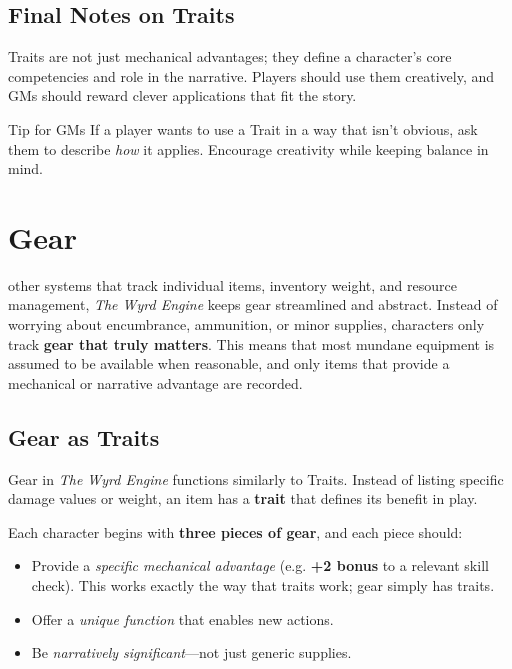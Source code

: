 \subsection{Final Notes on Traits}

Traits are not just mechanical advantages; they define a character’s core competencies and role in the narrative. Players should use them creatively, and GMs should reward clever applications that fit the story.

\begin{DndComment}{Tip for GMs}
 If a player wants to use a Trait in a way that isn’t obvious, ask them to describe \emph{how} it applies. Encourage creativity while keeping balance in mind.
\end{DndComment}

\section{Gear}

 other systems that track individual items, inventory weight, and resource management, \emph{The Wyrd Engine} keeps gear streamlined and abstract. Instead of worrying about encumbrance, ammunition, or minor supplies, characters only track \textbf{gear that truly matters}. This means that most mundane equipment is assumed to be available when reasonable, and only items that provide a mechanical or narrative advantage are recorded.

\subsection{Gear as Traits}
Gear in \emph{The Wyrd Engine} functions similarly to Traits. Instead of listing specific damage values or weight, an item has a \textbf{trait} that defines its benefit in play. 

Each character begins with \textbf{three pieces of gear}, and each piece should:
\begin{itemize}
    \item Provide a \emph{specific mechanical advantage} (e.g. \textbf{+2 bonus} to a relevant skill check). This works exactly the way that traits work; gear simply has traits.
    \item Offer a \emph{unique function} that enables new actions.
    \item Be \emph{narratively significant}—not just generic supplies.
\end{itemize}

